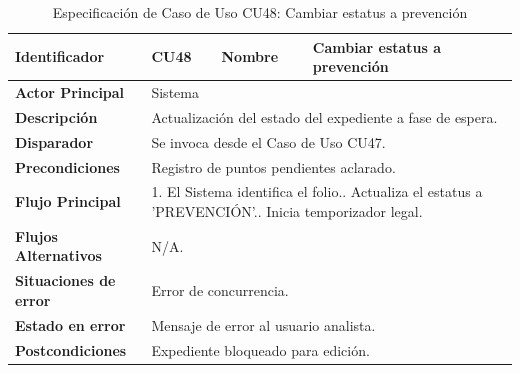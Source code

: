 \begingroup
\setlength{\parskip}{0pt}
\begin{longtable}{|p{3.5cm}|p{2cm}|p{2.5cm}|p{7cm}|}
\caption{Especificación de Caso de Uso CU48: Cambiar estatus a prevención}
\label{tab:cu48} \\
\hline
\textbf{Identificador} & CU48 & \textbf{Nombre} & Cambiar estatus a prevención \\ \hline
\textbf{Actor Principal} & \multicolumn{3}{p{11.5cm}|}{Sistema} \\ \hline
\textbf{Descripción} & \multicolumn{3}{p{11.5cm}|}{Actualización del estado del expediente a fase de espera.} \\ \hline
\textbf{Disparador} & \multicolumn{3}{p{11.5cm}|}{Se invoca desde el Caso de Uso CU47.} \\ \hline
\textbf{Precondiciones} & \multicolumn{3}{p{11.5cm}|}{Registro de puntos pendientes aclarado.} \\ \hline
\textbf{Flujo Principal} & \multicolumn{3}{p{11.5cm}|}{1. El Sistema identifica el folio.\newline 2. Actualiza el estatus a 'PREVENCIÓN'.\newline 3. Inicia temporizador legal.} \\ \hline
\textbf{Flujos Alternativos} & \multicolumn{3}{p{11.5cm}|}{N/A.} \\ \hline
\textbf{Situaciones de error} & \multicolumn{3}{p{11.5cm}|}{Error de concurrencia.} \\ \hline
\textbf{Estado en error} & \multicolumn{3}{p{11.5cm}|}{Mensaje de error al usuario analista.} \\ \hline
\textbf{Postcondiciones} & \multicolumn{3}{p{11.5cm}|}{Expediente bloqueado para edición.} \\ \hline
\end{longtable}
\endgroup

\vspace{0.8cm}

